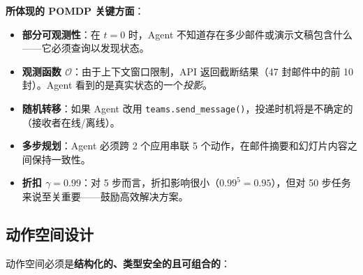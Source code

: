 \begin{examplebox}
\textbf{所体现的 POMDP 关键方面}：

\begin{itemize}
  \item \textbf{部分可观测性}：在 $t=0$ 时，Agent 不知道存在多少邮件或演示文稿包含什么——它必须查询以发现状态。
  \item \textbf{观测函数 $\mathcal{O}$}：由于上下文窗口限制，API 返回截断结果（47 封邮件中的前 10 封）。Agent 看到的是真实状态的一个\emph{投影}。
  \item \textbf{随机转移}：如果 Agent 改用 \texttt{teams.send\_message()}，投递时机将是不确定的（接收者在线/离线）。
  \item \textbf{多步规划}：Agent 必须跨 2 个应用串联 5 个动作，在邮件摘要和幻灯片内容之间保持一致性。
  \item \textbf{折扣 $\gamma=0.99$}：对 5 步而言，折扣影响很小（$0.99^5 = 0.95$），但对 50 步任务来说至关重要——鼓励高效解决方案。
\end{itemize}
\end{examplebox}

\subsection{动作空间设计}
\label{action-space-design}

动作空间必须是\textbf{结构化的、类型安全的且可组合的}：

